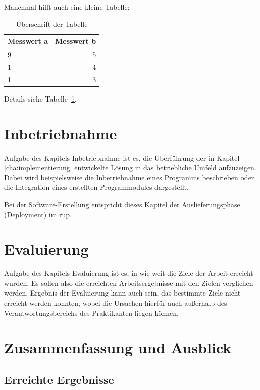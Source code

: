 \documentclass[oneside]{ausarbeitung}
\begin{document}
Manchmal hilft auch eine kleine Tabelle:

\begin{table}[htbp]
\centering
\begin{tabular}{|l|r|}
\hline
\textbf{Messwert a} & \textbf{Messwert b} \\ \hline
9 & 5 \\ \hline
1 & 4 \\ \hline
1 & 3 \\ \hline
\end{tabular}
\caption{Überschrift der Tabelle}
\label{tab:my-table}
\end{table}

Details siehe Tabelle~\ref{tab:my-table}.
\chapter{Inbetriebnahme}
\label{cha:inbetriebnahme}

Aufgabe des Kapitels Inbetriebnahme ist es, die Überführung der in 
Kapitel \ref{cha:implementierung} entwickelte Lösung in das betriebliche 
Umfeld aufzuzeigen. Dabei wird beispielsweise die Inbetriebnahme eines 
Programms beschrieben oder die Integration eines erstellten 
Programmodules dargestellt.

Bei der Software-Erstellung entspricht dieses Kapitel der 
Auslieferungsphase (Deployment) im \ac{rup}.

\chapter{Evaluierung}

Aufgabe des Kapitels Evaluierung ist es, in wie weit die Ziele der 
Arbeit erreicht wurden. Es sollen also die erreichten Arbeitsergebnisse 
mit den Zielen verglichen werden. Ergebnis der Evaluierung kann auch 
sein, das bestimmte Ziele nicht erreicht werden konnten, wobei die 
Ursachen hierfür auch außerhalb des Verantwortungsbereichs des 
Praktikanten liegen können.

\chapter{Zusammenfassung und Ausblick}
\label{cha:zusammenfassung}

\section{Erreichte Ergebnisse}
\label{sec:ergebnisse}
\end{document}
